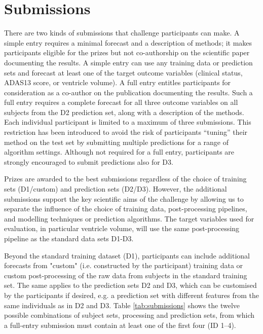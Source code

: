 \section{Submissions}
\label{submissions}

There are two kinds of submissions that challenge participants can make. A simple entry requires a minimal forecast and a description of methods; it makes participants eligible for the prizes but not co-authorship on the scientific paper documenting the results. A simple entry can use any training data or prediction sets and forecast at least one of the target outcome variables (clinical status, ADAS13 score, or ventricle volume). A full entry entitles participants for consideration as a co-author on the publication documenting the results. Such a full entry requires a complete forecast for all three outcome variables on all subjects from the D2 prediction set, along with a description of the methods. Each individual participant is limited to a maximum of three submissions. This restriction has been introduced to avoid the risk of participants “tuning” their method on the test set by submitting multiple predictions for a range of algorithm settings. Although not required for a full entry, participants are strongly encouraged to submit predictions also for D3. 

Prizes are awarded to the best submissions regardless of the choice of training sets (D1/custom) and prediction sets (D2/D3). However, the additional submissions support the key scientific aims of the challenge by allowing us to separate the influence of the choice of training data, post-processing pipelines, and modelling techniques or prediction algorithms. The target variables used for evaluation, in particular ventricle volume, will use the same post-processing pipeline as the standard data sets D1-D3.

Beyond the standard training dataset (D1), participants can include additional forecasts from "custom" (i.e. constructed by the participant) training data or custom post-processing of the raw data from subjects in the standard training set. The same applies to the prediction sets D2 and D3, which can be customised by the participants if desired, e.g. a prediction set with different features from the same individuals as in D2 and D3. Table \ref{tab:submissions} shows the twelve possible combinations of subject sets, processing and prediction sets, from which a full-entry submission must contain at least one of the first four (ID 1--4). 


